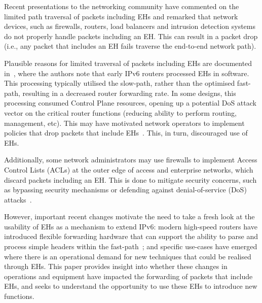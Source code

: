 \documentclass[conference]{IEEEtran}
\begin{document}
Recent presentations to the networking community have commented on the limited path traversal of packets including EHs and remarked that network devices, such as firewalls, routers, load balancers and intrusion detection systems~\cite{nalini-iepg114, fernando-talk} do not properly handle packets including an EH. This can result in a packet drop  (i.e., any packet that includes an EH fails traverse the end-to-end network path).

Plausible reasons for limited traversal of packets including EHs are documented in~\cite{ietf-v6ops-hbh-03}, where the authors note that early IPv6 routers
processed EHs in software. This processing typically utilised the slow-path, rather than the optimised fast-path, resulting in a decreased router forwarding rate. In some designs, this processing consumed Control Plane resources, opening up a potential DoS attack vector on the critical router functions (reducing ability to perform routing, management, etc). This may have motivated network operators to implement policies that drop packets that include EHs~\cite{rfc9098}.  This, in turn,
discouraged use of EHs. 

Additionally, some network administrators may use firewalls to implement Access Control Lists (ACLs) at the outer edge of access and enterprise networks, which discard packets including an EH. This is done to mitigate security concerns, such as bypassing security mechanisms or defending against denial-of-service (DoS) attacks~\cite{naagas2021deh}.


However, important recent changes motivate the need to take a fresh look at the usability of EHs as a mechanism to extend IPv6: modern high-speed routers have introduced flexible forwarding hardware that can support the ability to parse and process simple headers within the fast-path~\cite{programmable-data-plane, cisco-silicon-one, hauser2023}; and specific use-cases have emerged where there is an operational demand for new techniques that could be realised through EHs.
This paper provides insight into whether these changes in operations and equipment have impacted the forwarding of packets that include EHs, and seeks to understand the opportunity to use these EHs to introduce new functions. 
\end{document}
